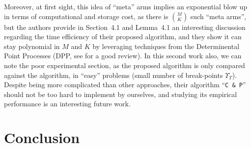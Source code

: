 Moreover, at first sight, this idea of ``meta'' arms implies an exponential blow up in terms of computational and storage cost, as there is ${M \choose K}$ such ``meta arms'', but
the authors provide in Section~4.1 and Lemma~4.1 an interesting discussion regarding the time efficiency of their proposed algorithm, and they show it can stay polynomial in $M$ and $K$ by leveraging techniques from the Determinental Point Processes (DPP, see \cite{GaBaVa18} for a good review).
%
In this second work also, we can note the poor experimental section, as the proposed algorithm is only compared against the \MusicalChair{} algorithm, in ``easy'' problems (small number of break-points $\Upsilon_T$).
Despite being more complicated than other approaches, their algorithm ``\texttt{C \& P}'' should not be too hard to implement by ourselves, and studying its empirical performance is an interesting future work.






\newpage  %
\section{Conclusion}
\label{sec:5:conclusion}

